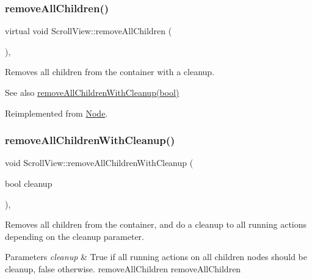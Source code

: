 \subsubsection{\texorpdfstring{remove\+All\+Children()}{removeAllChildren()}\hspace{0.1cm}{\footnotesize\ttfamily [2/2]}}
{\footnotesize\ttfamily virtual void Scroll\+View\+::remove\+All\+Children (\begin{DoxyParamCaption}{ }\end{DoxyParamCaption})\hspace{0.3cm}{\ttfamily [override]}, {\ttfamily [virtual]}}

Removes all children from the container with a cleanup.

\begin{DoxySeeAlso}{See also}
{\ttfamily \hyperlink{classScrollView_ac71d0fe89be6291abbccf6a6f8f011b4}{remove\+All\+Children\+With\+Cleanup(bool)}} 
\end{DoxySeeAlso}


Reimplemented from \hyperlink{classNode_a0f6ef5518d2e5dd5be405e98b37ace4a}{Node}.

\mbox{\label{classScrollView_ac71d0fe89be6291abbccf6a6f8f011b4}} 
\subsubsection{\texorpdfstring{remove\+All\+Children\+With\+Cleanup()}{removeAllChildrenWithCleanup()}\hspace{0.1cm}{\footnotesize\ttfamily [1/2]}}
{\footnotesize\ttfamily void Scroll\+View\+::remove\+All\+Children\+With\+Cleanup (\begin{DoxyParamCaption}\item[{bool}]{cleanup }\end{DoxyParamCaption})\hspace{0.3cm}{\ttfamily [override]}, {\ttfamily [virtual]}}

Removes all children from the container, and do a cleanup to all running actions depending on the cleanup parameter.


\begin{DoxyParams}{Parameters}
{\em cleanup} & True if all running actions on all children nodes should be cleanup, false otherwise.  remove\+All\+Children  remove\+All\+Children \\
\hline
\end{DoxyParams}


